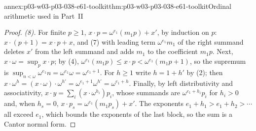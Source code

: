 \begin{annexitem}{annex:p03-w03-p03-038-e61-toolkit}{thm:p03-w03-p03-038-e61-toolkit}{Ordinal arithmetic used in Part~II}
\begin{proof}
\emph{(8).} For finite \(p\ge1\), \(x\cdot p=\omega^{e_1}(m_1p)+x'\), by
induction on \(p\): \(x\cdot(p+1)=x\cdot p+x\), and (7) with leading term
\(\omega^{e_1}m_1\) of the right summand deletes \(x'\) from the left
summand and adds \(m_1\) to the coefficient \(m_1p\). Next,
\(x\cdot\omega=\sup_px\cdot p\); by (4),
\(\omega^{e_1}(m_1p)\le x\cdot p<\omega^{e_1}(m_1p+1)\), so the supremum
is \(\sup_{n<\omega}\omega^{e_1}n=\omega^{e_1}\omega=\omega^{e_1+1}\). For
\(h\ge1\) write \(h=1+h'\) by (2); then
\(x\cdot\omega^h=(x\cdot\omega)\cdot\omega^{h'}=\omega^{e_1+1}\omega^{h'}
=\omega^{e_1+h}\). Finally, by left distributivity and associativity,
\(x\cdot y=\sum_i(x\cdot\omega^{h_i})p_i\), whose summands are
\(\omega^{e_1+h_i}p_i\) for \(h_i>0\) and, when \(h_s=0\),
\(x\cdot p_s=\omega^{e_1}(m_1p_s)+x'\). The exponents
\(e_1+h_1>e_1+h_2>\cdots\) all exceed \(e_1\), which bounds the exponents
of the last block, so the sum is a Cantor normal form.
\end{proof}
\end{annexitem}

